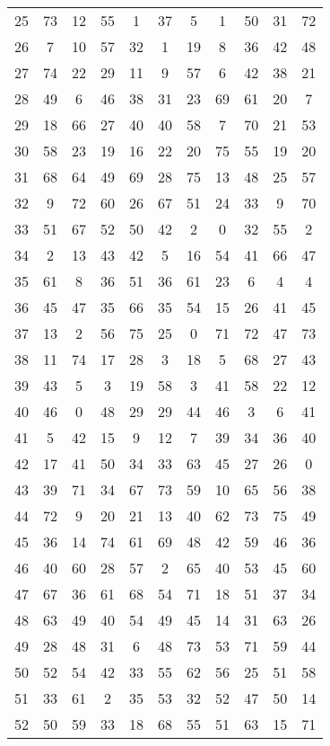 \begin{table}
\begin{tabular}{c c c c c c c c c c c }
25 & 73 & 12 & 55 & 1 & 37 & 5 & 1 & 50 & 31 & 72 \\
26 & 7 & 10 & 57 & 32 & 1 & 19 & 8 & 36 & 42 & 48 \\
27 & 74 & 22 & 29 & 11 & 9 & 57 & 6 & 42 & 38 & 21 \\
28 & 49 & 6 & 46 & 38 & 31 & 23 & 69 & 61 & 20 & 7 \\
29 & 18 & 66 & 27 & 40 & 40 & 58 & 7 & 70 & 21 & 53 \\
30 & 58 & 23 & 19 & 16 & 22 & 20 & 75 & 55 & 19 & 20 \\
31 & 68 & 64 & 49 & 69 & 28 & 75 & 13 & 48 & 25 & 57 \\
32 & 9 & 72 & 60 & 26 & 67 & 51 & 24 & 33 & 9 & 70 \\
33 & 51 & 67 & 52 & 50 & 42 & 2 & 0 & 32 & 55 & 2 \\
34 & 2 & 13 & 43 & 42 & 5 & 16 & 54 & 41 & 66 & 47 \\
35 & 61 & 8 & 36 & 51 & 36 & 61 & 23 & 6 & 4 & 4 \\
36 & 45 & 47 & 35 & 66 & 35 & 54 & 15 & 26 & 41 & 45 \\
37 & 13 & 2 & 56 & 75 & 25 & 0 & 71 & 72 & 47 & 73 \\
38 & 11 & 74 & 17 & 28 & 3 & 18 & 5 & 68 & 27 & 43 \\
39 & 43 & 5 & 3 & 19 & 58 & 3 & 41 & 58 & 22 & 12 \\
40 & 46 & 0 & 48 & 29 & 29 & 44 & 46 & 3 & 6 & 41 \\
41 & 5 & 42 & 15 & 9 & 12 & 7 & 39 & 34 & 36 & 40 \\
42 & 17 & 41 & 50 & 34 & 33 & 63 & 45 & 27 & 26 & 0 \\
43 & 39 & 71 & 34 & 67 & 73 & 59 & 10 & 65 & 56 & 38 \\
44 & 72 & 9 & 20 & 21 & 13 & 40 & 62 & 73 & 75 & 49 \\
45 & 36 & 14 & 74 & 61 & 69 & 48 & 42 & 59 & 46 & 36 \\
46 & 40 & 60 & 28 & 57 & 2 & 65 & 40 & 53 & 45 & 60 \\
47 & 67 & 36 & 61 & 68 & 54 & 71 & 18 & 51 & 37 & 34 \\
48 & 63 & 49 & 40 & 54 & 49 & 45 & 14 & 31 & 63 & 26 \\
49 & 28 & 48 & 31 & 6 & 48 & 73 & 53 & 71 & 59 & 44 \\
50 & 52 & 54 & 42 & 33 & 55 & 62 & 56 & 25 & 51 & 58 \\
51 & 33 & 61 & 2 & 35 & 53 & 32 & 52 & 47 & 50 & 14 \\
52 & 50 & 59 & 33 & 18 & 68 & 55 & 51 & 63 & 15 & 71 \\

\end{tabular}
\end{table}
